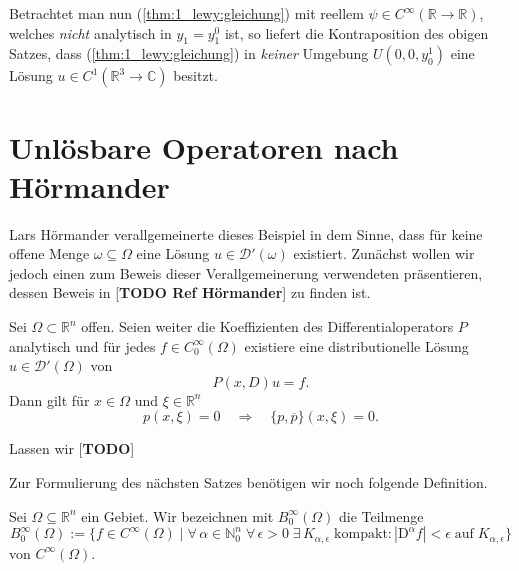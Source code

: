 Betrachtet man nun (\ref{thm:1_lewy:gleichung}) mit reellem $\psi\in C^\infty(\mathbb{R}\rightarrow\mathbb{R})$, welches \textit{nicht} analytisch in $y_1=y_1^0$ ist, so liefert die Kontraposition des obigen Satzes, dass (\ref{thm:1_lewy:gleichung}) in \textit{keiner} Umgebung $U(0,0,y_0^1)$ eine Lösung $u\in C^1(\mathbb{R}^3\rightarrow\mathbb{C})$ besitzt.




\section{Unlösbare Operatoren nach Hörmander}
Lars Hörmander verallgemeinerte dieses Beispiel in dem Sinne, dass für keine offene Menge $\omega\subseteq\Omega$ eine Lösung $u\in\mathscr{D}'(\omega)$ existiert. Zunächst wollen wir jedoch einen zum Beweis dieser Verallgemeinerung verwendeten präsentieren, dessen Beweis in [\textbf{TODO Ref Hörmander}] zu finden ist.

\begin{thm}
Sei $\Omega\subset\mathbb{R}^n$ offen. Seien weiter die Koeffizienten des Differentialoperators $P$ analytisch und für jedes $f\in C_0^\infty(\Omega)$ existiere eine distributionelle Lösung $u\in\mathscr D'(\Omega)$ von
\begin{equation}\label{thm:3.1_hoer}
P(x,D)u=f.
\end{equation}
Dann gilt für $x\in\Omega$ und $\xi\in\mathbb{R}^n$
\begin{equation}\label{thm:3.1_hoer_aussage}
p(x,\xi)=0\quad\Rightarrow\quad \{p,\overline{p}\}(x,\xi)=0.
\end{equation}
\end{thm}

\begin{rem}
Lassen wir [\textbf{TODO}]
\end{rem}



Zur Formulierung des nächsten Satzes benötigen wir noch folgende Definition.

\begin{df}
Sei $\Omega\subseteq\mathbb{R}^n$ ein Gebiet. Wir bezeichnen mit $B_0^\infty(\Omega)$ die Teilmenge 
\begin{equation}
B_0^\infty(\Omega) :=\{f\in C^\infty(\Omega) \mid \forall\,\alpha\in\mathbb{N}_0^n\;\forall\,\epsilon >0\;\exists\,K_{\alpha,\epsilon}\;\mathrm{kompakt} : |\mathrm D^\alpha f|<\epsilon\;\mathrm{auf\;} K_{\alpha,\epsilon}\}
\end{equation}
von $C^\infty(\Omega)$.
\end{df}



